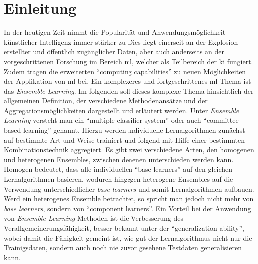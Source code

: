 


\onehalfspacing
{}
\setcounter{page}{1}
\pagestyle{scrheadings}

\section{Einleitung}

In der heutigen Zeit nimmt die Popularität und Anwendungsmöglichkeit künstlicher Intelligenz immer stärker zu \autocite[S.1]{Boutaba.2018}
Dies liegt einerseit an der Explosion erstellter und öffentlich zugänglicher Daten, aber auch anderseits an der vorgeschrittenen Forschung im Bereich \gls{ml}, welcher als Teilbereich der \gls{ki} fungiert. Zudem tragen die erweiterten \enquote{computing capabilities} \autocite[S.1]{Boutaba.2018} zu neuen Möglichkeiten der Applikation von \gls{ml} bei. Ein komplexeres und fortgeschrittenes \gls{ml}-Thema ist das \textit{Ensemble Learning}. Im folgenden soll dieses komplexe Thema hinsichtlich der allgemeinen Definition, der verschiedene Methodenansätze und der Aggregationsmöglichkeiten dargestellt und erläutert werden. Unter \textit{Ensemble Learning} versteht man ein \enquote{multiple classifier system}\autocite[S.182]{Zhou.2021} oder auch \enquote{committee-based learning}\autocite[S.15]{Zhou.2012} genannt. Hierzu werden individuelle Lernalgorithmen zunächst auf bestimmte Art und Weise trainiert und folgend mit Hilfe einer bestimmten Kombinationstechnik aggregiert. Es gibt zwei verschiedene Arten, den homogenen und heterogenen Ensembles, zwischen denenen unterschieden werden kann. Homogen bedeutet, dass alle individuellen \enquote{base learners}\autocite[S.182]{Zhou.2021} auf den gleichen Lernalgorithmen basieren, wodurch hingegen heterogene Ensembles auf die Verwendung unterschiedlicher \textit{base learners} und somit Lernalgorithmen aufbauen. Werd ein heterogenes Ensemble betrachtet, so spricht man jedoch nicht mehr von \textit{base learners}, sondern von \enquote{component learners}\autocite[S.15]{Zhou.2012}. Ein Vorteil bei der Anwendung von \textit{Ensemble Learning}-Methoden ist die Verbesserung des Verallgemeinerungsfähigkeit, besser bekannt unter der \enquote{generalization ability}\autocite[S.15]{Zhou.2021}, wobei damit die Fähigkeit gemeint ist, wie gut der Lernalgorithmus nicht nur die Trainigsdaten, sondern auch noch nie zuvor gesehene Testdaten generalisieren kann.

